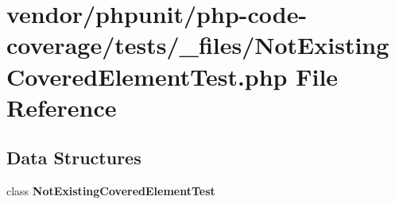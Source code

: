 \section{vendor/phpunit/php-\/code-\/coverage/tests/\+\_\+files/\+Not\+Existing\+Covered\+Element\+Test.php File Reference}
\label{php-code-coverage_2tests_2__files_2_not_existing_covered_element_test_8php}
\subsection*{Data Structures}
\begin{DoxyCompactItemize}
\item 
class {\bf Not\+Existing\+Covered\+Element\+Test}
\end{DoxyCompactItemize}
